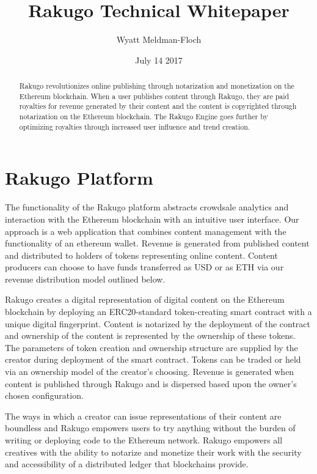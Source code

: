 \documentclass{article}
\title{Rakugo Technical Whitepaper}
\author{Wyatt Meldman-Floch}
\date{July 14 2017}
\begin{document}
\maketitle

\begin{abstract}
Rakugo revolutionizes online publishing through notarization and monetization on the Ethereum blockchain. When a user publishes content through Rakugo, they are paid royalties for revenue generated by their content and the content is copyrighted through notarization on the Ethereum blockchain. The Rakugo Engine goes further by optimizing royalties through increased user influence and trend creation.

\end{abstract}

\section{Rakugo Platform}
The functionality of the Rakugo platform abstracts crowdsale analytics and interaction with the Ethereum blockchain with an intuitive user interface. Our approach is a web application that combines content management with the functionality of an ethereum wallet. Revenue is generated from published content and distributed to holders of tokens representing online content. Content producers can choose to have funds transferred as USD or as ETH via our revenue distribution model outlined below.

Rakugo creates a digital representation of digital content on the Ethereum blockchain by deploying an ERC20-standard token-creating smart contract with a unique digital fingerprint. Content is notarized by the deployment of the contract and ownership of the content is represented by the ownership of these tokens. The parameters of token creation and ownership structure are supplied by the creator during deployment of the smart contract. Tokens can be traded or held via an ownership model of the creator's choosing. Revenue is generated when content is published through Rakugo and is dispersed based upon the owner's chosen configuration.

The ways in which a creator can issue representations of their content are boundless and Rakugo empowers users to try anything without the burden of writing or deploying code to the Ethereum network. 
Rakugo empowers all creatives with the ability to notarize and monetize their work with the security and accessibility of a distributed ledger that blockchains provide.
\end{document}
